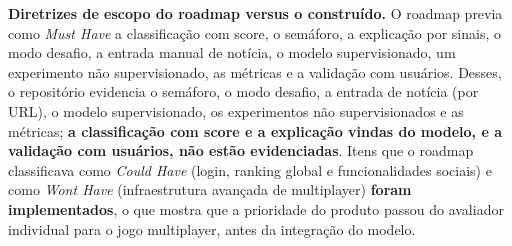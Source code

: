 \documentclass[
  brazilian,
  11pt,
]{article}
\begin{document}
\textbf{Diretrizes de escopo do roadmap versus o construído.} O roadmap previa como \emph{Must Have} a classificação com score, o semáforo, a explicação por sinais, o modo desafio, a entrada manual de notícia, o modelo supervisionado, um experimento não supervisionado, as métricas e a validação com usuários. Desses, o repositório evidencia o semáforo, o modo desafio, a entrada de notícia (por URL), o modelo supervisionado, os experimentos não supervisionados e as métricas; \textbf{a classificação com score e a explicação vindas do modelo, e a validação com usuários, não estão evidenciadas}. Itens que o roadmap classificava como \emph{Could Have} (login, ranking global e funcionalidades sociais) e como \emph{Won\textquotesingle t Have} (infraestrutura avançada de multiplayer) \textbf{foram implementados}, o que mostra que a prioridade do produto passou do avaliador individual para o jogo multiplayer, antes da integração do modelo.
\end{document}
